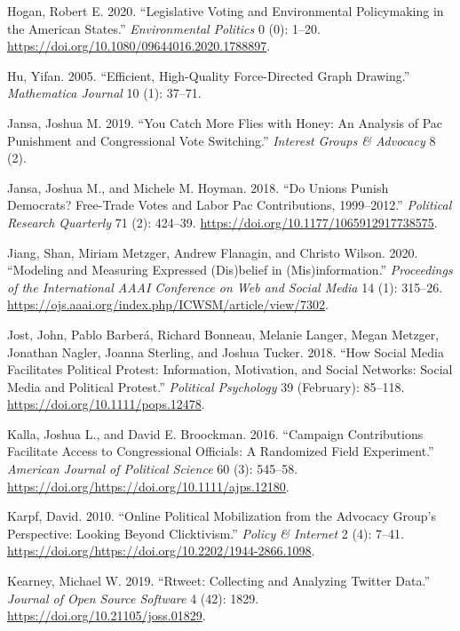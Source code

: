 \documentclass[12pt,]{article}
\begin{document}
\leavevmode\hypertarget{ref-hogan2020}{}%
Hogan, Robert E. 2020. ``Legislative Voting and Environmental
Policymaking in the American States.'' \emph{Environmental Politics} 0
(0): 1--20. \url{https://doi.org/10.1080/09644016.2020.1788897}.

\leavevmode\hypertarget{ref-yifanhu}{}%
Hu, Yifan. 2005. ``Efficient, High-Quality Force-Directed Graph
Drawing.'' \emph{Mathematica Journal} 10 (1): 37--71.

\leavevmode\hypertarget{ref-jansa2019}{}%
Jansa, Joshua M. 2019. ``You Catch More Flies with Honey: An Analysis of
Pac Punishment and Congressional Vote Switching.'' \emph{Interest Groups
\& Advocacy} 8 (2).

\leavevmode\hypertarget{ref-jansa2018}{}%
Jansa, Joshua M., and Michele M. Hoyman. 2018. ``Do Unions Punish
Democrats? Free-Trade Votes and Labor Pac Contributions, 1999--2012.''
\emph{Political Research Quarterly} 71 (2): 424--39.
\url{https://doi.org/10.1177/1065912917738575}.

\leavevmode\hypertarget{ref-jiang2020}{}%
Jiang, Shan, Miriam Metzger, Andrew Flanagin, and Christo Wilson. 2020.
``Modeling and Measuring Expressed (Dis)belief in (Mis)information.''
\emph{Proceedings of the International AAAI Conference on Web and Social
Media} 14 (1): 315--26.
\url{https://ojs.aaai.org/index.php/ICWSM/article/view/7302}.

\leavevmode\hypertarget{ref-jost2018}{}%
Jost, John, Pablo Barberá, Richard Bonneau, Melanie Langer, Megan
Metzger, Jonathan Nagler, Joanna Sterling, and Joshua Tucker. 2018.
``How Social Media Facilitates Political Protest: Information,
Motivation, and Social Networks: Social Media and Political Protest.''
\emph{Political Psychology} 39 (February): 85--118.
\url{https://doi.org/10.1111/pops.12478}.

\leavevmode\hypertarget{ref-kalla2016}{}%
Kalla, Joshua L., and David E. Broockman. 2016. ``Campaign Contributions
Facilitate Access to Congressional Officials: A Randomized Field
Experiment.'' \emph{American Journal of Political Science} 60 (3):
545--58. \url{https://doi.org/https://doi.org/10.1111/ajps.12180}.

\leavevmode\hypertarget{ref-karpf2010}{}%
Karpf, David. 2010. ``Online Political Mobilization from the Advocacy
Group's Perspective: Looking Beyond Clicktivism.'' \emph{Policy \&
Internet} 2 (4): 7--41.
\url{https://doi.org/https://doi.org/10.2202/1944-2866.1098}.

\leavevmode\hypertarget{ref-rtweet}{}%
Kearney, Michael W. 2019. ``Rtweet: Collecting and Analyzing Twitter
Data.'' \emph{Journal of Open Source Software} 4 (42): 1829.
\url{https://doi.org/10.21105/joss.01829}.
\end{document}
